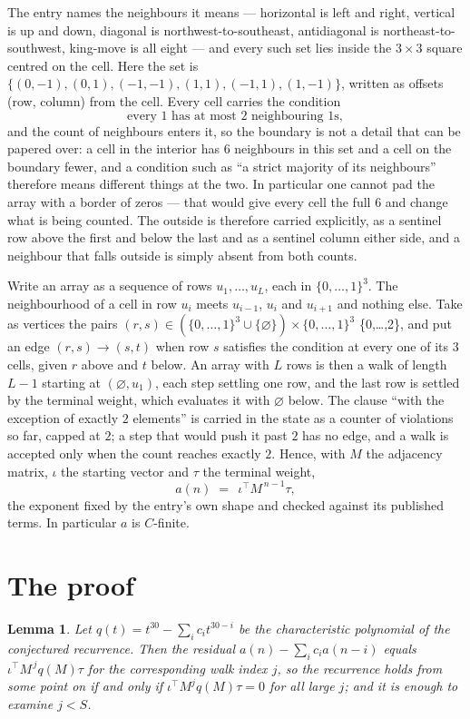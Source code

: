 \documentclass[11pt,a4paper]{article}
\theoremstyle{plain}
\newtheorem{lemma}[theorem]{Lemma}
\theoremstyle{definition}
\begin{document}
The entry names the neighbours it means --- horizontal is left and right, vertical is up and
down, diagonal is northwest-to-southeast, antidiagonal is northeast-to-southwest, king-move is
all eight --- and every such set lies inside the $3\times3$ square centred on the cell. Here
the set is $\{(0,-1), (0,1), (-1,-1), (1,1), (-1,1), (1,-1)\}$, written as offsets (row, column) from the cell. Every cell carries
the condition
\[
\text{every 1 has at most 2 neighbouring 1s},
\]
and the count of neighbours enters it, so the boundary is not a detail that can be papered
over: a cell in the interior has $6$ neighbours in this set and a cell on the boundary
fewer, and a condition such as ``a strict majority of its neighbours'' therefore means
different things at the two. In particular one cannot pad the array with a border of zeros ---
that would give every cell the full $6$ and change what is being counted. The outside is
therefore carried
explicitly, as a sentinel row above the first and below the last and as a sentinel column
either side, and a neighbour that falls outside is simply absent from both counts.

Write an array as a sequence of rows $u_1,\dots,u_L$, each in
$\{0,\dots,1\}^{3}$. The neighbourhood of a cell in row $u_i$ meets $u_{i-1}$,
$u_i$ and $u_{i+1}$ and nothing else. Take as vertices the pairs
$(r,s)\in(\{0,\dots,1\}^{3}\cup\{\varnothing\})\times\{0,\dots,1\}^{3}$ \times \{0,\dots,2\},
and put an edge $(r,s)\to(s,t)$ when row $s$ satisfies the condition at every one of its
$3$ cells, given $r$ above and $t$ below. An array with $L$ rows is then a walk of length
$L-1$ starting at $(\varnothing,u_1)$, each step settling one row, and the last row is
settled by the terminal weight, which evaluates it with $\varnothing$ below. The clause ``with the exception of exactly $2$ elements'' is carried in
the state as a counter of violations so far, capped at $2$; a step that would push it past
$2$ has no edge, and a walk is accepted only when the count reaches exactly $2$. Hence,
with $M$ the adjacency matrix, $\iota$ the starting vector and $\tau$ the terminal weight,
\[
a(n)\;=\;\,\iota^{\!\top}M^{\,n-1}\tau ,
\]
the exponent fixed by the entry's own shape and checked against its published terms. In
particular $a$ is $C$-finite.

\section{The proof}

\begin{lemma}\label{lem:crit}
Let $q(t)=t^{30}-\sum_i c_it^{30-i}$ be the characteristic polynomial of the
conjectured recurrence. Then the residual $a(n)-\sum_ic_ia(n-i)$ equals
$\iota^{\!\top}M^{\,j}q(M)\tau$ for the corresponding walk index $j$, so the
recurrence holds from some point on if and only if $\iota^{\!\top}M^{j}q(M)\tau=0$ for all
large $j$; and it is enough to examine $j<S$.
\end{lemma}
\end{document}
